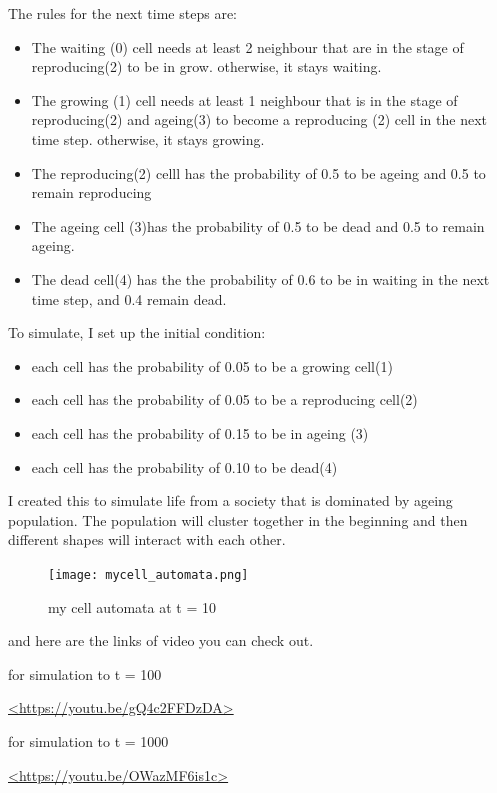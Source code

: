 \documentclass[12pt]{article}
\begin{document}
{The rules for the next time steps are:
\begin{itemize}  
\item The waiting (0) cell needs at least 2 neighbour that are in the stage of reproducing(2) to be in grow. otherwise, it stays waiting.
\item The growing (1) cell needs at least 1 neighbour that is in the stage of reproducing(2) and ageing(3) to become a reproducing (2) cell in the next time step. otherwise, it stays growing.
\item The reproducing(2) celll has the probability of 0.5 to be ageing and 0.5 to remain reproducing
\item The ageing cell (3)has the probability of 0.5 to be dead and 0.5 to remain ageing.
\item The dead cell(4) has the the probability of 0.6 to be in waiting in the next time step, and 0.4 remain dead.
\end{itemize}

To simulate, I set up the initial condition:

\begin{itemize}  
\item each cell has the probability of 0.05 to be a growing cell(1)
\item each cell has the probability of 0.05 to be a reproducing cell(2)
\item each cell has the probability of 0.15 to be in ageing (3)
\item each cell has the probability of 0.10 to be dead(4)
\end{itemize}

I created this to simulate life from a society that is dominated by ageing population. The population will cluster together in the beginning and then different shapes will interact with each other.

\begin{figure}[H] %
\centering
\texttt{[image: mycell\_automata.png]}
\caption{my cell automata at t = 10}
\label{fig:myca}
\end{figure}

and here are the links of video you can check out.\par 
for simulation to t = 100\par
\url{<https://youtu.be/gQ4c2FFDzDA>}\par
for simulation to t = 1000\par
\url{<https://youtu.be/OWazMF6is1c>}\par



}
\end{document}
